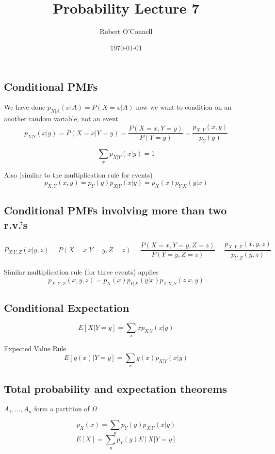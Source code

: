 \documentclass{article}
\title{\textbf{Probability Lecture 7}}
\author{Robert O'Connell}
\date{\today}
\begin{document}
\maketitle

\subsection*{Conditional PMFs}
We have done \(p_{X|A}(x|A) = P(X=x|A)\)
now we want to condition on an another random variable, not an event
\[
p_{X|Y}(x|y) = P(X=x|Y=y) = \frac{P(X=x,Y=y)}{P(Y=y)} = \frac{p_{X,Y}(x,y)}{p_Y(y)}
\]

\[
\sum_xp_{X|Y}(x|y) = 1
\]

Also (similar to the multiplication rule for events)
\[
p_{X,Y}(x,y) = p_Y(y)p_{X|Y}(x|y) = p_X(x)p_{Y|X}(y|x)
\]

\subsection*{Conditional PMFs involving more than two r.v.'s}
\[
P_{X|Y,Z}(x|y,z) = P(X=x|Y=y,Z=z) = \frac{P(X=x,Y=y,Z=z)}{P(Y=y, Z=z)} = \frac{p_{X,Y,Z}(x,y,z)}{p_{Y,Z}(y,z)}
\]

Similar multiplication rule (for three events) applies
\[
p_{X,Y,Z}(x,y,z) = p_X(x)p_{Y|X}(y|x)p_{Z|X,Y}(z|x,y)
\]

\subsection*{Conditional Expectation}
\[
E[X|Y = y] = \sum_x xp_{X|Y}(x|y)
\]

Expected Value Rule
\[
E[g(x)|Y=y] =\sum_x g(x)p_{X|Y}(x|y)
\]

\subsection*{Total probability and expectation theorems}
\(
A_1, \dots , A_n
\) form a partition of \(\Omega\)

\[
p_X(x) = \sum_y p_Y(y)p_{X|Y}(x|y)
\]
\[
E[X] = \sum_y p_Y(y)E[X|Y=y]
\]
\end{document}
